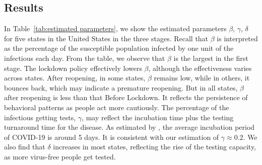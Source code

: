 \documentclass[nonblindrev, copyedit]{informs3a}
\newcommand\nc[1]{\textcolor{red}{NC: #1}}
\begin{document}
\subsection{Results}
\label{Results}
In Table~\ref{tab:estimated parameters}, we show the estimated parameters $\beta$, $\gamma$, $\delta$ for five states in the United States in the three stages.
Recall that $\beta$ is interpreted as the percentage of the susceptible population infected by one unit of the infectious each day.
From the table, we observe that $\beta$ is the largest in the first stage.
The lockdown policy effectively lowers $\beta$, although the effectiveness varies across states.
After reopening, in some states, $\beta$ remains low, while in others, it bounces back, which may indicate a premature reopening.
But in all states, $\beta$ after reopening is less than that Before Lockdown.
It reflects the persistence of behavioral patterns as people act more cautiously.
The percentage of the infectious getting tests, $\gamma$, may reflect the incubation time plus the testing turnaround time for the disease.
As estimated by \citet{lauer2020incubation,he2020temporal}, the average incubation period of COVID-19 is around 5 days.
It is consistent with our estimation of $\gamma\approx 0.2$.
We also find that $\delta$ increases in most states, reflecting the rise of the testing capacity, as more virus-free people get tested.
\end{document}
